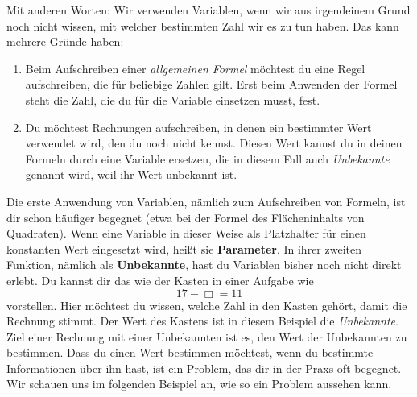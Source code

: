 \documentclass[../../main.tex]{subfiles}
\begin{document}
Mit anderen Worten: Wir verwenden Variablen, wenn wir aus irgendeinem Grund noch nicht wissen, mit welcher bestimmten Zahl wir es zu tun haben. Das kann mehrere Gründe haben:

\begin{enumerate}[label=(\arabic*)]
    \item Beim Aufschreiben einer \emph{allgemeinen Formel} möchtest du eine Regel aufschreiben, die für beliebige Zahlen gilt. Erst beim Anwenden der Formel steht die Zahl, die du für die Variable einsetzen musst, fest.
    \item Du möchtest Rechnungen aufschreiben, in denen ein bestimmter Wert verwendet wird, den du noch nicht kennst. Diesen Wert kannst du in deinen Formeln durch eine Variable ersetzen, die in diesem Fall auch \emph{Unbekannte} genannt wird, weil ihr Wert unbekannt ist.
\end{enumerate}

Die erste Anwendung von Variablen, nämlich zum Aufschreiben von Formeln, ist dir schon häufiger begegnet (etwa bei der Formel des Flächeninhalts von Quadraten). Wenn eine Variable in dieser Weise als Platzhalter für einen konstanten Wert eingesetzt wird, heißt sie \textbf{Parameter}. In ihrer zweiten Funktion, nämlich als \textbf{Unbekannte}, hast du Variablen bisher noch nicht direkt erlebt. Du kannst dir das wie der Kasten in einer Aufgabe wie
\[17-\Box=11\] 
vorstellen. Hier möchtest du wissen, welche Zahl in den Kasten gehört, damit die Rechnung stimmt. Der Wert des Kastens ist in diesem Beispiel die \emph{Unbekannte}. Ziel einer Rechnung mit einer Unbekannten ist es, den Wert der Unbekannten zu bestimmen. Dass du einen Wert bestimmen möchtest, wenn du bestimmte Informationen über ihn hast, ist ein Problem, das dir in der Praxs oft begegnet. Wir schauen uns im folgenden Beispiel an, wie so ein Problem aussehen kann.
\end{document}
